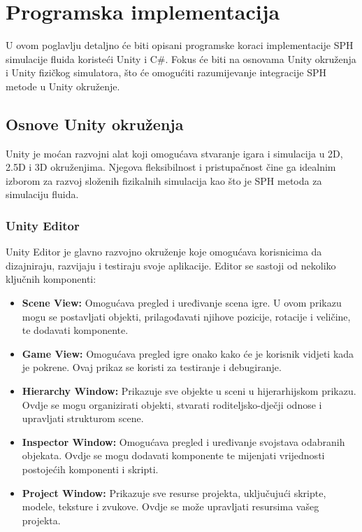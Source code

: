 \documentclass[diplomskirad]{fer}
\begin{document}
    \chapter{Programska implementacija}\label{ch:programska-implementacija}

    U ovom poglavlju detaljno će biti opisani programske koraci implementacije SPH simulacije fluida koristeći Unity i C\#.
    Fokus će biti na osnovama Unity okruženja i Unity fizičkog simulatora, što će omogućiti razumijevanje integracije SPH metode u Unity okruženje.


    \section{Osnove Unity okruženja}\label{sec:osnove-unity-okruzenja}

    Unity je moćan razvojni alat koji omogućava stvaranje igara i simulacija u 2D, 2.5D i 3D okruženjima. Njegova fleksibilnost i pristupačnost čine ga idealnim izborom za razvoj složenih fizikalnih simulacija kao što je SPH metoda za simulaciju fluida.

    \subsection{Unity Editor}\label{subsec:unity-editor}
    Unity Editor je glavno razvojno okruženje koje omogućava korisnicima da dizajniraju, razvijaju i testiraju svoje aplikacije.
    Editor se sastoji od nekoliko ključnih komponenti:
    \begin{itemize}
        \item \textbf{Scene View:} Omogućava pregled i uređivanje scena igre.
        U ovom prikazu mogu se postavljati objekti, prilagođavati njihove pozicije, rotacije i veličine, te dodavati komponente.
        \item \textbf{Game View:} Omogućava pregled igre onako kako će je korisnik vidjeti kada je pokrene.
        Ovaj prikaz se koristi za testiranje i debugiranje.
        \item \textbf{Hierarchy Window:} Prikazuje sve objekte u sceni u hijerarhijskom prikazu.
        Ovdje se mogu organizirati objekti, stvarati roditeljsko-dječji odnose i upravljati strukturom scene.
        \item \textbf{Inspector Window:} Omogućava pregled i uređivanje svojstava odabranih objekata.
        Ovdje se mogu dodavati komponente te mijenjati vrijednosti postojećih komponenti i skripti.
        \item \textbf{Project Window:} Prikazuje sve resurse projekta, uključujući skripte, modele, teksture i zvukove.
        Ovdje se može upravljati resursima vašeg projekta.
    \end{itemize}
\end{document}
